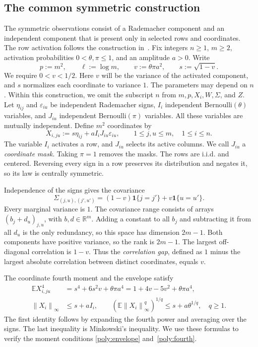 \documentclass[11pt,letterpaper]{article}
\theoremstyle{remark}
\newcommand{\E}{\mathbb E}
\newcommand{\R}{\mathbb R}
\newcommand{\norm}[1]{\left\lVert#1\right\rVert}
\newcommand{\ind}{\mathbf 1}
\begin{document}
\subsection{The common symmetric construction}
\label{app:lower-family}

The symmetric observations consist of a Rademacher component and
an independent component that is present only in selected rows and
coordinates. The row activation follows the construction
in~\cite[Proposition~E.1]{FKLZ}.
Fix integers \(n\ge1\), \(m\ge2\), activation probabilities
\(0<\theta,\pi\le1\), and an amplitude \(a>0\). Write
\[
 p:=m^2,\qquad \ell:=\log m,\qquad
 v:=\theta\pi a^2,\qquad s:=\sqrt{1-v}.
\]
We require \(0<v<1/2\). Here \(v\) will be the variance of the
activated component, and \(s\) normalizes each coordinate to variance
\(1\). The parameters may depend on \(n\). Within this construction,
we omit the subscript \(n\) from \(m,p,X_i,W,\Sigma\), and \(Z\).
Let \(\eta_{ij}\) and \(\varepsilon_{iu}\) be independent Rademacher
signs, \(I_i\) independent Bernoulli\((\theta)\) variables, and
\(J_{iu}\) independent Bernoulli\((\pi)\) variables. All these
variables are mutually independent. Define \(m^2\) coordinates by
\begin{equation}
 X_{i,ju}:=s\eta_{ij}+aI_iJ_{iu}\varepsilon_{iu},
 \qquad 1\le j,u\le m,\quad 1\le i\le n.
 \label{sym:eq:common-construction}
\end{equation}
The variable \(I_i\) activates a row, and \(J_{iu}\) selects its
active columns. We call \(J_{iu}\) a \emph{coordinate mask}. Taking
\(\pi=1\) removes the masks. The rows are i.i.d. and centered.
Reversing every sign in a row preserves its distribution and negates
it, so its law is centrally symmetric.

Independence of the signs gives the covariance
\begin{equation}
 \Sigma_{(j,u),(j',u')}=(1-v)\ind\{j=j'\}+v\ind\{u=u'\}.
 \label{sym:eq:common-covariance}
\end{equation}
Every marginal variance is \(1\). The covariance range consists of
arrays \((b_j+d_u)_{j,u}\), with \(b,d\in\R^m\).
Adding a constant to all \(b_j\) and subtracting it from all \(d_u\)
is the only redundancy, so this space has dimension \(2m-1\).
Both components have positive variance, so the rank is \(2m-1\).
The largest off-diagonal correlation is \(1-v\). Thus the
\emph{correlation gap}, defined as \(1\) minus the largest absolute
correlation between distinct coordinates, equals \(v\).

The coordinate fourth moment and the envelope satisfy
\begin{align}
 \E X_{i,ju}^4
 &=s^4+6s^2v+\theta\pi a^4
   =1+4v-5v^2+\theta\pi a^4,\label{lower:eq:family-fourth}\\
 \norm{X_i}_\infty&\le s+aI_i,\qquad
 (\E\norm{X_i}_\infty^q)^{1/q}\le s+a\theta^{1/q},
 \quad q\ge1.
 \label{lower:eq:family-envelope}
\end{align}
The first identity follows by expanding the fourth power and averaging
over the signs. The last inequality is Minkowski's inequality.
We use these formulas to verify the moment conditions
\eqref{poly:envelope} and~\eqref{poly:fourth}.
\end{document}
